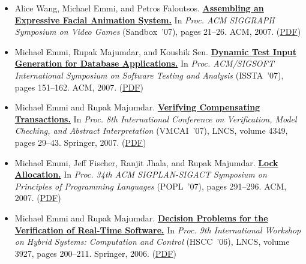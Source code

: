 \documentclass{article}
\begin{document}
\begin{itemize}[leftmargin=0cm,label={}]
    \item Alice Wang, Michael Emmi, and Petros Faloutsos. {\bf\href{%
    http://doi.acm.org/10.1145/1274940.1274947}{%
    Assembling an Expressive Facial Animation System.}} In \emph{ Proc. ACM SIGGRAPH Symposium on Video Games } (Sandbox ’07), pages 21–26. ACM, 2007. (\href{https://michael-emmi.github.io/https://github.com/michael-emmi/research-papers/raw/master/conf-sandbox-WangEF07.pdf}{PDF})


    \item Michael Emmi, Rupak Majumdar, and Koushik Sen. {\bf\href{%
    http://doi.acm.org/10.1145/1273463.1273484}{%
    Dynamic Test Input Generation for Database Applications.}} In \emph{ Proc. ACM/SIGSOFT International Symposium on Software Testing and Analysis } (ISSTA ’07), pages 151–162. ACM, 2007. (\href{https://michael-emmi.github.io/https://github.com/michael-emmi/research-papers/raw/master/conf-issta-EmmiMS07.pdf}{PDF})


    \item Michael Emmi and Rupak Majumdar. {\bf\href{%
    http://dx.doi.org/10.1007/978-3-540-69738-1_2}{%
    Verifying Compensating Transactions.}} In \emph{ Proc. 8th International Conference on Verification, Model Checking, and Abstract Interpretation } (VMCAI ’07), LNCS, volume 4349, pages 29–43. Springer, 2007. (\href{https://michael-emmi.github.io/https://github.com/michael-emmi/research-papers/raw/master/conf-vmcai-EmmiM07.pdf}{PDF})


    \item Michael Emmi, Jeff Fischer, Ranjit Jhala, and Rupak Majumdar. {\bf\href{%
    http://doi.acm.org/10.1145/1190216.1190260}{%
    Lock Allocation.}} In \emph{ Proc. 34th ACM SIGPLAN-SIGACT Symposium on Principles of Programming Languages } (POPL ’07), pages 291–296. ACM, 2007. (\href{https://michael-emmi.github.io/https://github.com/michael-emmi/research-papers/raw/master/conf-popl-EmmiFJM07.pdf}{PDF})


    \item Michael Emmi and Rupak Majumdar. {\bf\href{%
    http://dx.doi.org/10.1007/11730637_17}{%
    Decision Problems for the Verification of Real-Time Software.}} In \emph{ Proc. 9th International Workshop on Hybrid Systems: Computation and Control } (HSCC ’06), LNCS, volume 3927, pages 200–211. Springer, 2006. (\href{https://michael-emmi.github.io/https://github.com/michael-emmi/research-papers/raw/master/conf-hscc-EmmiM06.pdf}{PDF})

  \end{itemize}
\end{document}
